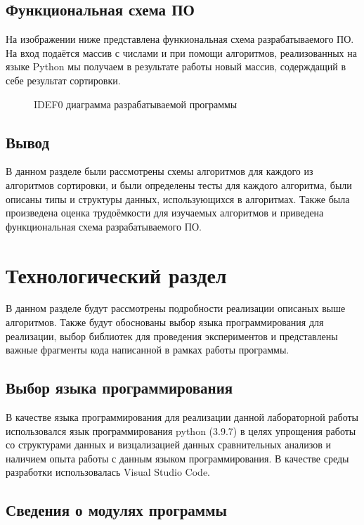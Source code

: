 \section{Функциональная схема ПО}
На изображении ниже представлена функиональная схема разрабатываемого ПО. На вход подаётся массив с числами и при помощи алгоритмов, реализованных на языке Python мы получаем в результате работы новый массив, содерждащий в себе результат сортировки.

\begin{figure}[ph!]
	\caption{IDEF0 диаграмма разрабатываемой программы}
\end{figure}

\section{Вывод}
В данном разделе были рассмотрены схемы алгоритмов для каждого из алгоритмов сортировки, и были определены тесты для каждого алгоритма, были описаны типы и структуры данных, использующихся в алгоритмах. Также была произведена оценка трудоёмкости для изучаемых алгоритмов и приведена функциональная схема разрабатываемого ПО.

\chapter{Технологический раздел}

В данном разделе будут рассмотрены подробности реализации описаных выше алгоритмов. Также будут обоснованы выбор языка программирования для реализации, выбор библиотек для проведения экспериментов и представлены важные фрагменты кода написанной в рамках работы программы.

\section{Выбор языка программирования}

В качестве языка программирования для реализации данной лабораторной работы использовался язык программирования python (3.9.7) в целях упрощения работы со структурами данных и визцализацией данных сравнительных анализов и наличием опыта работы с данным языком программирования. В качестве среды разработки использовалась Visual Studio Code. 

\section{Сведения о модулях программы}

